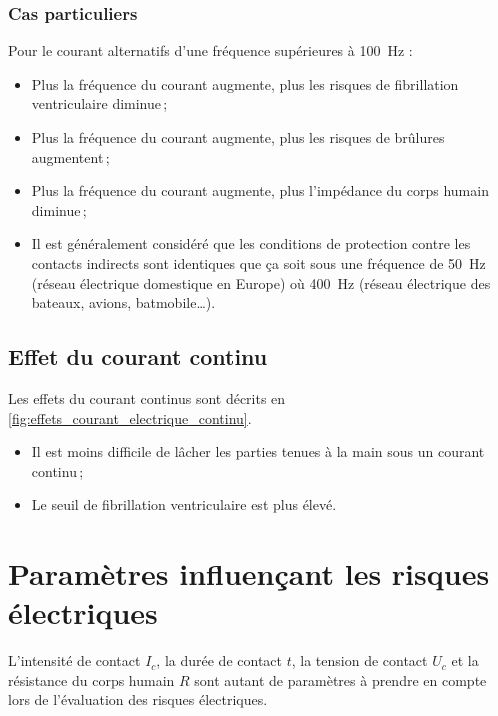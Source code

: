 

\subsubsection{Cas particuliers}

Pour le courant alternatifs d'une fréquence supérieures à \SI{100}{\hertz} :

\begin{itemize}
\item Plus la fréquence du courant augmente, plus les risques de fibrillation ventriculaire diminue\,;
\item Plus la fréquence du courant augmente, plus les risques de brûlures augmentent\,;
\item Plus la fréquence du courant augmente, plus l'impédance du corps humain diminue\,;
\item Il est généralement considéré que les conditions de protection contre les contacts indirects sont identiques que ça soit sous une fréquence de \SI{50}{\hertz} (réseau électrique domestique en Europe) où \SI{400}{\hertz} (réseau électrique des bateaux, avions, batmobile\ldots).
\end{itemize}

\subsection{Effet du courant continu}

Les effets du courant continus sont décrits en \autoref{fig:effets_courant_electrique_continu}.



\begin{itemize}
\item Il est moins difficile de lâcher les parties tenues à la main sous un courant continu\,;
\item Le seuil de fibrillation ventriculaire est plus élevé.
\end{itemize}

\section{Paramètres influençant les risques électriques}

L'intensité de contact $I_c$, la durée de contact $t$, la tension de contact $U_c$ et la résistance du corps humain $R$ sont autant de paramètres à prendre en compte lors de l'évaluation des risques électriques.


